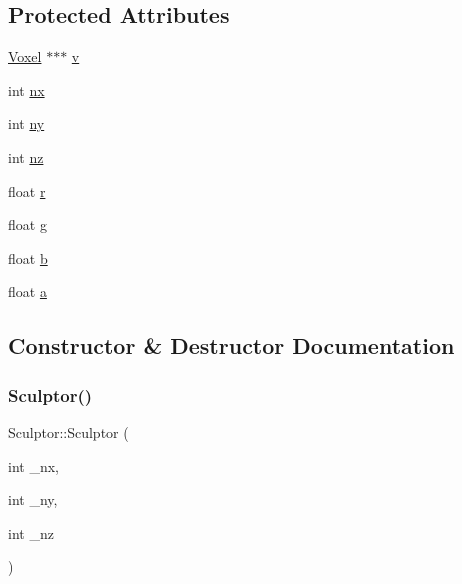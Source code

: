 \subsection*{Protected Attributes}
\begin{DoxyCompactItemize}
\item 
\mbox{\hyperlink{struct_voxel}{Voxel}} $\ast$$\ast$$\ast$ \mbox{\hyperlink{class_sculptor_a4ca53a2f2fbf41ca42dfe729ebe693f1}{v}}
\item 
int \mbox{\hyperlink{class_sculptor_ad1e32f9042538419a3bc7b376f7813b8}{nx}}
\item 
int \mbox{\hyperlink{class_sculptor_a1ce2ff97ec94927928ab3f5ec4ba6761}{ny}}
\item 
int \mbox{\hyperlink{class_sculptor_a33204e7df26a7ee4c7192381a24335d3}{nz}}
\item 
float \mbox{\hyperlink{class_sculptor_a3f5d2ec3b66d645019b8d81c810a1cd8}{r}}
\item 
float \mbox{\hyperlink{class_sculptor_a208c06af69a81a1568df4493868816f1}{g}}
\item 
float \mbox{\hyperlink{class_sculptor_a7aafd7305ea634252d8288b60536cd96}{b}}
\item 
float \mbox{\hyperlink{class_sculptor_a6fd0157dcf17582f0edd5fddf157604e}{a}}
\end{DoxyCompactItemize}


\subsection{Constructor \& Destructor Documentation}
\mbox{\label{class_sculptor_a014e3ef5517bf0e9d9e14486b6ac6433}} 
\subsubsection{\texorpdfstring{Sculptor()}{Sculptor()}}
{\footnotesize\ttfamily Sculptor\+::\+Sculptor (\begin{DoxyParamCaption}\item[{int}]{\+\_\+nx,  }\item[{int}]{\+\_\+ny,  }\item[{int}]{\+\_\+nz }\end{DoxyParamCaption})}

\mbox{\label{class_sculptor_a8f159bf97458326f16d2e238e11be7ff}} 
